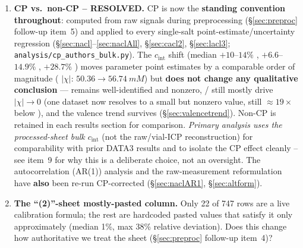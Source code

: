 \documentclass[11pt]{article}
\newcommand{\cint}{c_{\mathrm{int}}}
\begin{document}
\begin{enumerate}[itemsep=3pt,leftmargin=2.2em,start=7]
  \item \textbf{CP vs.\ non-CP -- RESOLVED.} CP is now the \textbf{standing
        convention throughout}: computed from raw signals during preprocessing
        (\S\ref{sec:preproc} follow-up item~5) and applied to every
        single-salt point-estimate/uncertainty regression
        (\S\ref{sec:nacl}--\ref{sec:naclAll}, \S\ref{sec:cacl2},
        \S\ref{sec:lacl3}; \texttt{analysis/cp\_authors\_bulk.py}).
        The $\cint$ shift (median $+10$--$14\%$ , $+6.6$--$14.9\%$
        , $+28.7\%$ ) moves parameter point estimates by a
        comparable order of magnitude ( $|\chi|$: $50.36\to
        \SI{56.74}{mM}$) but \textbf{does not change any qualitative
        conclusion} ---  remains well-identified and nonzero,
        / still mostly drive $|\chi|\to0$ (one 
        dataset now resolves to a small but nonzero value, still
        $\approx19\times$ below ), and the valence trend survives
        (\S\ref{sec:valencetrend}). Non-CP is retained in each results
        section for comparison. \emph{Primary analysis uses the processed-sheet
        bulk $\cint$} (not the raw/vial-ICP reconstruction) for
        comparability with prior DATA3 results and to isolate the CP effect
        cleanly -- see item~9 for why this is a deliberate choice, not an
        oversight. The autocorrelation (AR(1)) analysis and the
        raw-measurement reformulation have \textbf{also} been re-run
        CP-corrected (\S\ref{sec:naclAR1}, \S\ref{sec:altform}).
  \item \textbf{The ``(2)''-sheet mostly-pasted column.} Only 22 of 747 rows
        are a live calibration formula; the rest are hardcoded pasted values
        that satisfy it only approximately (median 1\%, max 38\% relative
        deviation). Does this change how authoritative we treat the sheet
        (\S\ref{sec:preproc} follow-up item~4)?
\end{enumerate}
\end{document}
